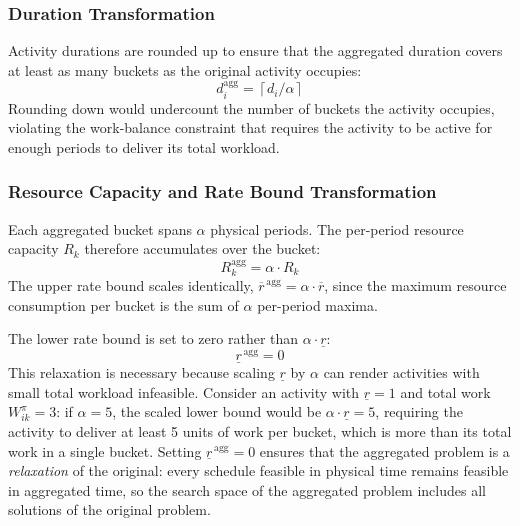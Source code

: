 \subsubsection*{Duration Transformation}

Activity durations are rounded up to ensure that the aggregated
duration covers at least as many buckets as the original activity
occupies:
\begin{equation}
    d_i^{\mathrm{agg}} = \left\lceil d_i / \alpha \right\rceil
    \label{eq:d_agg}
\end{equation}
Rounding down would undercount the number of buckets the activity
occupies, violating the work-balance constraint that requires the
activity to be active for enough periods to deliver its total
workload.

\subsubsection*{Resource Capacity and Rate Bound Transformation}

Each aggregated bucket spans $\alpha$ physical periods. The
per-period resource capacity $R_k$ therefore accumulates over the
bucket:
\begin{equation}
    R_k^{\mathrm{agg}} = \alpha \cdot R_k
    \label{eq:cap_agg}
\end{equation}
The upper rate bound scales identically,
$\overline{r}^{\,\mathrm{agg}} = \alpha \cdot \overline{r}$,
since the maximum resource consumption per bucket is the sum of
$\alpha$ per-period maxima.

The lower rate bound is set to zero rather than
$\alpha \cdot \underline{r}$:
\begin{equation}
    \underline{r}^{\,\mathrm{agg}} = 0
    \label{eq:lr_agg}
\end{equation}
This relaxation is necessary because scaling $\underline{r}$ by
$\alpha$ can render activities with small total workload
infeasible. Consider an activity with $\underline{r} = 1$ and
total work $W_{ik}^{\pi} = 3$: if $\alpha = 5$, the scaled lower
bound would be $\alpha \cdot \underline{r} = 5$, requiring the
activity to deliver at least 5 units of work per bucket, which is more
than its total work in a single bucket. Setting
$\underline{r}^{\,\mathrm{agg}} = 0$ ensures that the aggregated
problem is a \emph{relaxation} of the original: every schedule
feasible in physical time remains feasible in aggregated time,
so the search space of the aggregated problem includes all
solutions of the original problem.

